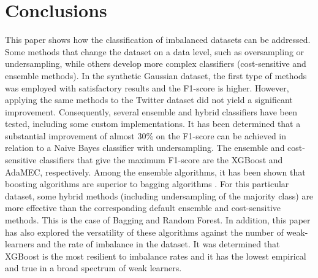 \documentclass[conference]{IEEEtran}
\begin{document}


\section{Conclusions}
This paper shows how the classification of imbalanced datasets can be addressed. Some methods that change the dataset on a data level, such as oversampling or undersampling, while others develop more complex classifiers (cost-sensitive and ensemble methods). In the synthetic Gaussian dataset, the first type of methods was employed with satisfactory results and the F1-score is higher. However, applying the same methods to the Twitter dataset did not yield a significant improvement. Consequently, several ensemble and hybrid classifiers have been tested, including some custom implementations. It has been determined that a substantial improvement of almost 30\% on the F1-score can be achieved in relation to a Naive Bayes classifier with undersampling. The ensemble and cost-sensitive classifiers that give the maximum F1-score are the XGBoost and AdaMEC, respectively. Among the ensemble algorithms, it has been shown that boosting algorithms are superior to bagging algorithms%
. For this particular dataset, some hybrid methods (including undersampling of the majority class) are more effective than the corresponding default ensemble and cost-sensitive methods. This is the case of Bagging and Random Forest. In addition, this paper has also explored the versatility of these algorithms against the number of weak-learners and the rate of imbalance in the dataset. It was determined that XGBoost is the most resilient to imbalance rates and it has the lowest empirical and true in a broad spectrum of weak learners.

\vspace{12pt}
\end{document}
